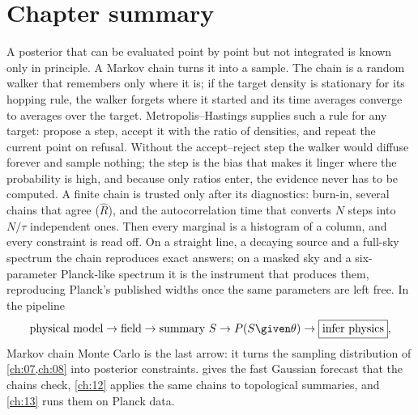 \section*{Chapter summary}
\label{9c:sec:summary}

A posterior that can be evaluated point by point but not integrated is known only in principle. A Markov chain turns
it into a sample. The chain is a random walker that remembers only where it is; if the target density is stationary
for its hopping rule, the walker forgets where it started and its time averages converge to averages over the target.
Metropolis--Hastings supplies such a rule for any target: propose a step, accept it with the ratio of densities, and
repeat the current point on refusal. Without the accept--reject step the walker would diffuse forever and sample
nothing; the step is the bias that makes it linger where the probability is high, and because only ratios enter, the
evidence never has to be computed. A finite chain is trusted only after its diagnostics: burn-in, several chains that
agree ($\hat R$), and the autocorrelation time that converts $N$ steps into $N/\tau$ independent ones. Then every
marginal is a histogram of a column, and every constraint is read off. On a straight line, a decaying source and a
full-sky spectrum the chain reproduces exact answers; on a masked sky and a six-parameter Planck-like spectrum it is
the instrument that produces them, reproducing Planck's published widths once the same parameters are left free. In
the pipeline
\[
  \text{physical model}\to\text{field}\to\text{summary }S\to P(S\given\theta)\to
  \boxed{\text{infer physics}},
\]
Markov chain Monte Carlo is the last arrow: it turns the sampling distribution of \cref{ch:07,ch:08} into posterior constraints.
 gives the fast Gaussian forecast that the chains check, \cref{ch:12} applies the same chains to
topological summaries, and \cref{ch:13} runs them on Planck data.

